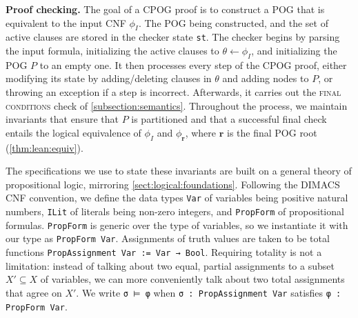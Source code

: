\documentclass[twoside,11pt]{article}
\newcommand{\inputformula}{\phi_I}
\newcommand{\makenode}[1]{\mathbf{#1}}
\newcommand{\noder}{\makenode{r}}
\begin{document}
\vspace{1em}\noindent
\textbf{Proof checking.} The goal of a CPOG proof is to construct a POG that is equivalent to the input CNF $\inputformula$. The POG being constructed, and the set of active clauses are stored in the checker state \texttt{st}. The checker begins by parsing the input formula, initializing the active clauses to $\theta \leftarrow \inputformula$, and initializing the POG $P$ to an empty one. It then processes every step of the CPOG proof, either modifying its state by adding/deleting clauses in $\theta$ and adding nodes to $P$, or throwing an exception if a step is incorrect. Afterwards, it carries out the \textsc{final conditions} check of \ref{subsection:semantics}. Throughout the process, we maintain invariants that ensure that $P$ is partitioned and that a successful final check entails the logical equivalence of $\inputformula$ and $\phi_\noder$, where $\noder$ is the final POG root (\ref{thm:lean:equiv}).

The specifications we use to state these invariants are built on a general theory of propositional logic, mirroring \ref{sect:logical:foundations}. Following the DIMACS CNF convention, we define the data types \lstinline{Var} of variables being positive natural numbers, \lstinline{ILit} of literals being non-zero integers, and \lstinline{PropForm} of propositional formulas. \lstinline{PropForm} is generic over the type of variables, so we instantiate it with our type as \lstinline{PropForm Var}. Assignments of truth values are taken to be total functions \lstinline{PropAssignment Var := Var → Bool}. Requiring totality is not a limitation: instead of talking about two equal, partial assignments to a subset $X' \subseteq X$ of variables, we can more conveniently talk about two total assignments that agree on $X'$. We write \lstinline{σ ⊨ φ} when \lstinline{σ : PropAssignment Var} satisfies \lstinline{φ : PropForm Var}.
\end{document}
